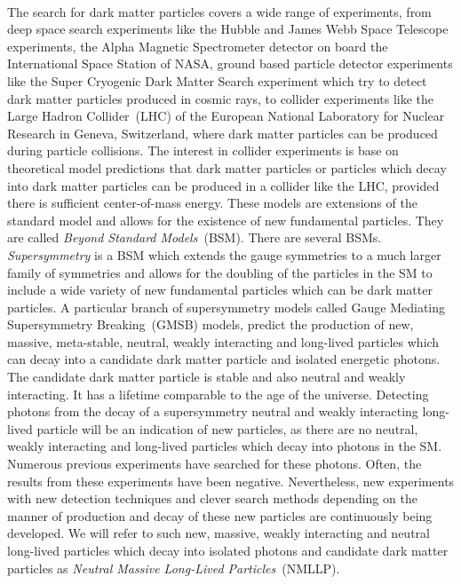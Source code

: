\paragraph*{}%
The search for dark matter particles covers a wide range of experiments, from deep space search experiments like the Hubble and James Webb Space Telescope experiments, the Alpha Magnetic Spectrometer detector on board the International Space Station of NASA, ground based particle detector experiments like the Super Cryogenic Dark Matter Search experiment which try to detect dark matter particles produced in cosmic rays, to collider experiments like the Large Hadron Collider~(LHC) of the European National Laboratory for Nuclear Research in Geneva, Switzerland, where dark matter particles can be produced during particle collisions.
The interest in collider experiments is base on theoretical model predictions that dark matter particles or particles which decay into dark matter particles can be produced in a collider like the LHC, provided there is sufficient center-of-mass energy. These models are extensions of the standard model and allows for the existence of new fundamental particles. They are called \textit{Beyond Standard Models}~(BSM). There are several BSMs. \textit{Supersymmetry} is a BSM which extends the gauge symmetries to a much larger family of symmetries and allows for the doubling of the particles in the SM to include a wide variety of new fundamental particles which can be dark matter particles\cite{SUSYDM,LSPDM}. A particular branch of supersymmetry models called Gauge Mediating Supersymmetry Breaking~(GMSB) models, predict the production of new, massive, meta-stable, neutral, weakly interacting and long-lived particles which can decay into a candidate dark matter particle and isolated energetic photons. The candidate dark matter particle is stable and also neutral and weakly interacting. It has a lifetime comparable to the age of the universe. Detecting photons from the decay of a supersymmetry neutral and weakly interacting long-lived particle will be an indication of new particles, as there are no neutral, weakly interacting and long-lived particles which decay into photons in the SM. Numerous previous experiments have searched for these photons. Often, the results from these experiments have been negative. Nevertheless, new experiments with new detection techniques and clever search methods depending on the manner of production and decay of these new particles are continuously being developed. 
We will refer to such new, massive, weakly interacting and neutral long-lived particles which decay into isolated photons and candidate dark matter particles  as \textit{Neutral Massive Long-Lived Particles}~(NMLLP).
